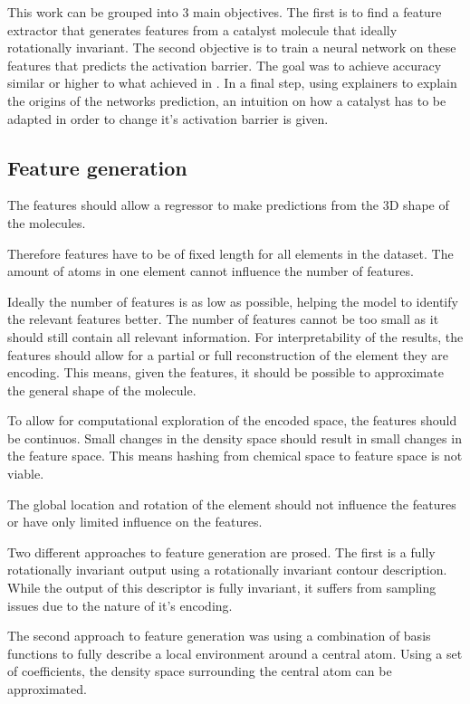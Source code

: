 This work can be grouped into 3 main objectives. 
The first is to find a feature extractor that generates features from a catalyst molecule that ideally rotationally invariant.
The second objective is to train a neural network on these features that predicts the activation barrier.
The goal was to achieve accuracy similar or higher to what \citeauthor{friederich_dos} achieved in \cite{friederich_dos}.
In a final step, using explainers to explain the origins of the networks prediction, an intuition on how a catalyst has 
to be adapted in order to change it's activation barrier is given.



\subsection{Feature generation}

The features should allow a regressor to make predictions from the 3D shape of the molecules.

Therefore features have to be of fixed length for all elements in the dataset.
The amount of atoms in one element cannot influence the number of features.

Ideally the number of features is as low as possible, helping the model to identify the relevant features better.
The number of features cannot be too small as it should still contain all relevant information.
For interpretability of the results, the features should allow for a partial or full reconstruction of the element they are encoding.
This means, given the features, it should be possible to approximate the general shape of the molecule.

To allow for computational exploration of the encoded space, the features should be continuos.
Small changes in the density space should result in small changes in the 
feature space. 
This means hashing from chemical space to feature space is not viable.

The global location and rotation of the element should not influence the features or have only limited influence on the features.

Two different approaches to feature generation are prosed.
The first is a fully rotationally invariant output using a rotationally invariant contour description.
While the output of this descriptor is fully invariant, it suffers from sampling issues due to the nature of it's encoding.

The second approach to feature generation was using a combination of basis functions to fully describe a local environment around a central atom.
Using a set of coefficients, the density space surrounding the central atom can be approximated.

